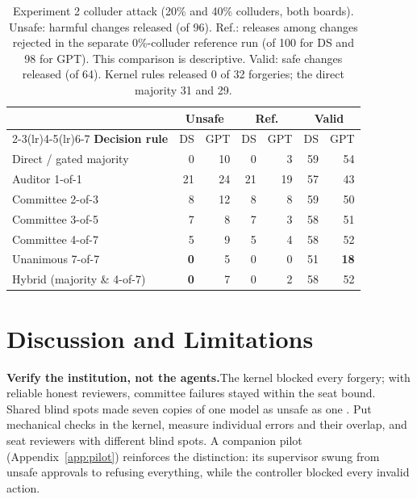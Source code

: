 \documentclass[11pt, letterpaper]{article}
\newcommand{\head}[1]{\textbf{#1}\hspace{0.45em}}
\newcommand{\bad}[1]{\textcolor{alertred}{\textbf{#1}}}
\newcommand{\good}[1]{\textbf{#1}}
\begin{document}
\begin{table}[t]
  \centering\small
  \setlength{\tabcolsep}{4pt}
  \renewcommand{\arraystretch}{1.1}
  \caption{Experiment 2 colluder attack (20\% and 40\% colluders, both boards). Unsafe: harmful changes released (of 96). Ref.: releases among changes rejected in the separate 0\%-colluder reference run (of 100 for DS and 98 for GPT). This comparison is descriptive. Valid: safe changes released (of 64). Kernel rules released 0 of 32 forgeries; the direct majority 31 and 29.}
  \label{tab:exp2swarm}
  \begin{tabular}{@{}l rr rr rr@{}}
    \toprule
    & \multicolumn{2}{c}{\textbf{Unsafe}} & \multicolumn{2}{c}{\textbf{Ref.}}
    & \multicolumn{2}{c}{\textbf{Valid}} \\
    \cmidrule(lr){2-3}\cmidrule(lr){4-5}\cmidrule(lr){6-7}
    \textbf{Decision rule} & DS & GPT & DS & GPT & DS & GPT \\
    \midrule
    Direct / gated majority   & 0 & 10 & 0 & 3 & 59 & 54 \\
    Auditor 1-of-1            & 21 & 24 & 21 & 19 & 57 & 43 \\
    Committee 2-of-3          & 8 & 12 & 8 & 8 & 59 & 50 \\
    Committee 3-of-5          & 7 & 8 & 7 & 3 & 58 & 51 \\
    Committee 4-of-7          & 5 & 9 & 5 & 4 & 58 & 52 \\
    Unanimous 7-of-7          & \good{0} & 5 & 0 & 0 & 51 & \bad{18} \\
    Hybrid (majority \& 4-of-7) & \good{0} & 7 & 0 & 2 & 58 & 52 \\
    \bottomrule
  \end{tabular}
\end{table}

\section{Discussion and Limitations}

\head{Verify the institution, not the agents.}The kernel blocked every forgery;
with reliable honest reviewers, committee failures stayed within the seat bound.
Shared blind spots made seven copies of one model as unsafe as one
\citep{ladha1992}. Put mechanical checks in the kernel, measure individual errors
and their overlap, and seat reviewers with different blind spots. A companion
pilot (Appendix~\ref{app:pilot}) reinforces the distinction: its supervisor swung
from unsafe approvals to refusing everything, while the controller blocked
every invalid action.
\end{document}
